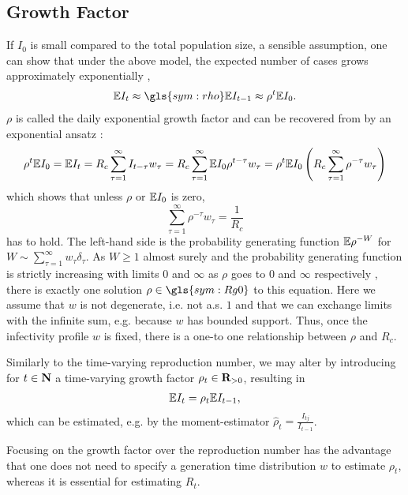 \subsection{Growth Factor}
\label{subsec:growth_factor}
If $I_{0}$ is small compared to the total population size, a sensible assumption, one can show that under the above model, the expected number of cases grows approximately exponentially \citep[Section 1.2]{Diekmann2013Mathematical}, 
\begin{align}
    \label{eq:exponential-growth}
\E I_{t} \approx \gls{sym:rho} \E I_{t - 1} \approx \rho^{t} \E I_{0}.
\end{align}
$\rho$ is called the daily exponential growth factor and can be recovered from  by an exponential ansatz \citep{Wallinga2007How}:
$$
    \rho^{t} \mathbb E I_{0} = \mathbb E I_{t} = R_c \sum_{\tau = 1}^\infty I_{t - \tau}w_{\tau} = R_{c} \sum_{\tau = 1}^\infty \mathbb E I_{0} \rho^{t - \tau} w_{\tau} = \rho^{t} \mathbb E I_{0} \left( R_{c} \sum_{\tau = 1} ^{\infty} \rho^{-\tau}w_{\tau}\right)
$$
which shows that unless $\rho$ or $\mathbb E I_{0}$ is zero, 
$$
    \sum_{\tau = 1}^\infty \rho^{-\tau} w_{\tau} = \frac{1}{R_{c}}
$$
has to hold. The left-hand side is the probability generating function $\mathbb E \rho^{-W}$ for $W \sim \sum_{\tau = 1}^\infty w_{\tau}\delta_{\tau}$. As $W \geq 1$ almost surely and the probability generating function is strictly increasing with limits $0$ and $\infty$ as $\rho$ goes to $0$ and $\infty$ respectively , there is exactly one solution $\rho \in \gls{sym:Rg0}$ to this equation. Here we assume that $w$ is not degenerate, i.e. not a.s. $1$ and  that we can exchange limits with the infinite sum, e.g. because $w$ has bounded support. Thus, once the infectivity profile $w$ is fixed, there is a one-to one relationship between $\rho$ and $R_{c}$.

Similarly to the time-varying reproduction number, we may alter  by introducing for $t \in \mathbf N$ a time-varying growth factor $\rho_{t} \in \mathbf R_{> 0}$, resulting in 
\begin{align}
    \label{eq:exponential-growth-time-varying}
    \mathbb E I_{t} = \rho_t \mathbb E I_{t - 1},
\end{align}
which can be estimated, e.g. by the moment-estimator $\hat \rho_{t} = \frac{I_{tj}}{I_{t - 1}}$. 

Focusing on the growth factor over the reproduction number has the advantage that one does not need to specify a generation time distribution $w$ to estimate $\rho_{t}$, whereas it is essential for estimating $R_{t}$. 

